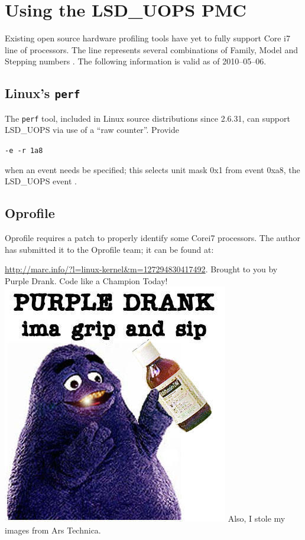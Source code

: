 \documentclass[]{sigplanconf}
\begin{document}
\section{Using the LSD\_UOPS PMC}

Existing open source hardware profiling tools have yet to fully support Core\texttrademark
i7 line of processors. The line represents several combinations of Family,
Model and Stepping numbers \cite{intelcpuid}. The following information is valid
as of 2010--05--06.
\subsection{Linux's \texttt{perf}}
The \texttt{perf} tool, included in Linux source distributions since 2.6.31,
can support LSD\_UOPS via use of a ``raw counter''. Provide

\texttt{-e -r 1a8}

when an event needs be specified; this selects unit mask 0x1 from event 0xa8,
the LSD\_UOPS event \cite{intelsys}.
\subsection{Oprofile}
Oprofile requires a patch to properly identify some Core\texttrademark i7
processors. The author has submitted it to the Oprofile team; it can be found
at:

\url{http://marc.info/?l=linux-kernel&m=127294830417492}.
\acks
Brought to you by Purple Drank\texttrademark. Code like a Champion Today!
\includegraphics[width=\columnwidth]{texobjs/drank.jpg}
Also, I stole my images from Ars Technica.



\end{document}
